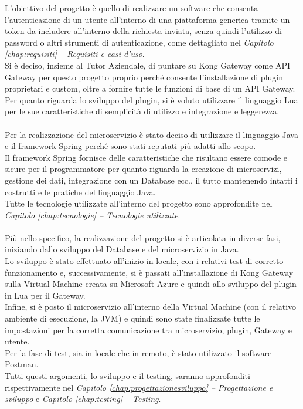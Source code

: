 L'obiettivo del progetto è quello di realizzare un software che consenta l'autenticazione di un utente all'interno di una piattaforma generica tramite un token 
da includere all'interno della richiesta inviata, senza quindi l'utilizzo di password o altri strumenti di autenticazione, 
come dettagliato nel \emph{Capitolo \ref{chap:requisiti} – Requisiti e casi d'uso}. \\

Si è deciso, insieme al Tutor Aziendale, di puntare su Kong Gateway come API Gateway per questo progetto proprio perché consente l'installazione di plugin 
proprietari e custom, oltre a fornire tutte le funzioni di base di un API Gateway.\\
Per quanto riguarda lo sviluppo del plugin, si è voluto utilizzare il linguaggio Lua per le sue caratteristiche di semplicità di utilizzo e integrazione e leggerezza.\\ \\

Per la realizzazione del microservizio è stato deciso di utilizzare il linguaggio Java e il framework Spring perché sono stati reputati più adatti allo scopo.\\
Il framework Spring fornisce delle caratteristiche che risultano essere comode e sicure per il programmatore per quanto riguarda la creazione di microservizi, 
gestione dei dati, integrazione con un Database ecc., il tutto mantenendo intatti i costrutti e le pratiche del linguaggio Java.\\
Tutte le tecnologie utilizzate all'interno del progetto sono approfondite nel \emph{Capitolo \ref{chap:tecnologie} – Tecnologie utilizzate}.\\ \\

Più nello specifico, la realizzazione del progetto si è articolata in diverse fasi, iniziando dallo sviluppo del Database e del microservizio in Java.\\
Lo sviluppo è stato effettuato all'inizio in locale, con i relativi test di corretto funzionamento e, successivamente, si è passati all'installazione di Kong Gateway
sulla Virtual Machine creata su Microsoft Azure e quindi allo sviluppo del plugin in Lua per il Gateway.\\
Infine, si è posto il microservizio all'interno della Virtual Machine (con il relativo ambiente di esecuzione, la JVM) e quindi sono state finalizzate tutte le 
impostazioni per la corretta comunicazione tra microservizio, plugin, Gateway e utente.\\
Per la fase di test, sia in locale che in remoto, è stato utilizzato il software Postman.\\
Tutti questi argomenti, lo sviluppo e il testing, saranno approfonditi rispettivamente nel \emph{Capitolo \ref{chap:progettazionesviluppo} – Progettazione e sviluppo} 
e \emph{Capitolo \ref{chap:testing} – Testing}.

